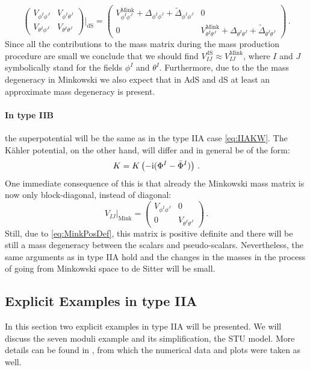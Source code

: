 \documentclass[12pt]{report}
\newcommand{\be}{\begin{equation}}
\newcommand{\ee}{\end{equation}}
\def\rmi{{\rm i}}
\begin{document}
\be 
\begin{pmatrix}
V_{\phi^I\phi^J} & V_{\phi^I \theta^J}\\
V_{\theta^I\phi^J} & V_{\theta^I \theta^J}
\end{pmatrix}\Bigg|_{\text{dS}}
=
\begin{pmatrix}
V^{\text{Mink}}_{\phi^I\phi^J} + \Delta_{\phi^I \phi^J}+ \tilde{\Delta}_{\phi^I \phi^J}& 0\\
0 & V^{\text{Mink}}_{\theta^I \theta^J}+\Delta_{\theta^I \theta^J}+\tilde{\Delta}_{\theta^I \theta^J}
\end{pmatrix}\,.
\ee
Since all the contributions to the mass matrix during the mass production procedure are small we conclude that we should find $V^{\text{dS}}_{IJ} \approx V^{\text{Mink}}_{IJ}$, where $I$ and $J$ symbolically stand for the fields $\phi^I$ and $\theta^I$. Furthermore, due to the the mass degeneracy in Minkowski we also expect that in AdS and dS at least an approximate mass degeneracy is present.
\paragraph{In type IIB} the superpotential will be the same as in the type IIA case \eqref{eq:IIAKW}. The Kähler potential, on the other hand, will differ and in general be of the form:
\be 
K = K\left(-\rmi ( \Phi^I - \bar{\Phi}^I )\right)\,.
\ee 
One immediate consequence of this is that already the Minkowski mass matrix is now only block-diagonal, instead of diagonal:
\be 
V_{IJ}|_{\text{Mink}}=
\begin{pmatrix}
V_{\phi^I\phi^J} & 0\\
0 & V_{\theta^I \theta^J}
\end{pmatrix}\,.
\ee
Still, due to \eqref{eq:MinkPosDef}, this matrix is positive definite and there will be still a mass degeneracy between the scalars and pseudo-scalars. Nevertheless, the same arguments as in type IIA hold and the changes in the masses in the process of going from Minkowski space to de Sitter will be small.

\subsection{Explicit Examples in type IIA}
\label{sec:massIIAexampel}
In this section two explicit examples in type IIA will be presented. We will discuss the seven moduli example and its simplification, the STU model. More details can be found in \cite{Cribiori:2019drf}, from which the numerical data and plots were taken as well.
\end{document}
